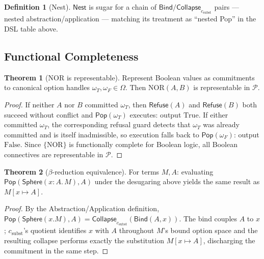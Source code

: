 \documentclass[12pt]{article}
\newcommand{\Sphere}{\mathsf{Sphere}}
\newcommand{\Pop}{\mathsf{Pop}}
\newcommand{\Nest}{\mathsf{Nest}}
\theoremstyle{definition}
\newtheorem{definition}{Definition}
\newtheorem{theorem}{Theorem}
\newcommand{\RefuseOp}{\mathsf{Refuse}}
\newcommand{\CollapseOp}{\mathsf{Collapse}}
\newcommand{\BindOp}{\mathsf{Bind}}
\begin{document}
\begin{definition}[Nest]
$\Nest$ is sugar for a chain of $\BindOp/\CollapseOp_{c_\mathrm{subst}}$ pairs — nested abstraction/application — matching its treatment as ``nested Pop'' in the DSL table above.
\end{definition}

\subsection{Functional Completeness}

\begin{theorem}[NOR is representable]
Represent Boolean values as commitments to canonical option handles $\omega_T,\omega_F\in\Omega$. Then $\mathrm{NOR}(A,B)$ is representable in $\mathcal{P}$.
\end{theorem}
\begin{proof}
If neither $A$ nor $B$ committed $\omega_T$, then $\RefuseOp(A)$ and $\RefuseOp(B)$ both succeed without conflict and $\Pop(\omega_T)$ executes: output $\mathrm{True}$. If either committed $\omega_T$, the corresponding refusal guard detects that $\omega_T$ was already committed and is itself inadmissible, so execution falls back to $\Pop(\omega_F)$: output $\mathrm{False}$. Since $\{\mathrm{NOR}\}$ is functionally complete for Boolean logic, all Boolean connectives are representable in $\mathcal{P}$.
\end{proof}

\begin{theorem}[$\beta$-reduction equivalence]
For terms $M, A$: evaluating $\Pop(\Sphere(x\!:\!A.\,M), A)$ under the desugaring above yields the same result as $M[x \mapsto A]$.
\end{theorem}
\begin{proof}
By the Abstraction/Application definition, $\Pop(\Sphere(x.M),A) = \CollapseOp_{c_\mathrm{subst}}(\BindOp(A,x))$. The bind couples $A$ to $x$; $c_\mathrm{subst}$'s quotient identifies $x$ with $A$ throughout $M$'s bound option space and the resulting collapse performs exactly the substitution $M[x\mapsto A]$, discharging the commitment in the same step.
\end{proof}
\end{document}

